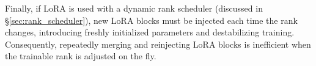 Finally, if LoRA is used with a dynamic rank scheduler (discussed in \S\ref{sec:rank_scheduler}), new LoRA blocks must be injected each time the rank changes, introducing freshly initialized parameters and destabilizing training. Consequently, repeatedly merging and reinjecting LoRA blocks is inefficient when the trainable rank is adjusted on the fly. 



